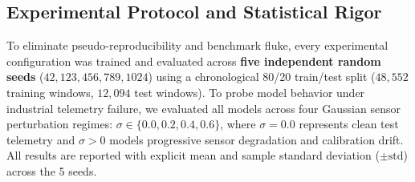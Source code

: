 \documentclass[preprint,3p,times]{elsarticle}
\begin{document}
\subsection{Experimental Protocol and Statistical Rigor}
To eliminate pseudo-reproducibility and benchmark fluke, every experimental configuration was trained and evaluated across \textbf{five independent random seeds} ($42, 123, 456, 789, 1024$) using a chronological 80/20 train/test split ($48,552$ training windows, $12,094$ test windows). To probe model behavior under industrial telemetry failure, we evaluated all models across four Gaussian sensor perturbation regimes: $\sigma \in \{0.0, 0.2, 0.4, 0.6\}$, where $\sigma=0.0$ represents clean test telemetry and $\sigma > 0$ models progressive sensor degradation and calibration drift. All results are reported with explicit mean and sample standard deviation ($\pm \text{std}$) across the 5 seeds.
\end{document}
